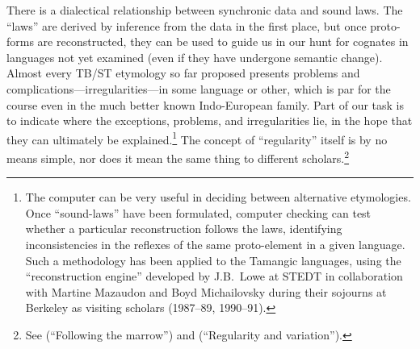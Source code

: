 There is a dialectical relationship between synchronic data and sound laws.
The “laws” are derived by inference from the data in the first place, but once
proto-forms are reconstructed, they can be used to guide us in our hunt for
cognates in languages not yet examined (even if they have undergone semantic
change). Almost every TB/ST etymology so far proposed presents problems and
complications—irregularities—in some language or other, which is par for
the course even in the much better known Indo-European family. Part of our task
is to indicate where the exceptions, problems, and irregularities lie, in the
hope that they can ultimately be explained.\footnote{The computer can be very
useful in deciding between alternative etymologies. Once “sound-laws” have been
formulated, computer checking can test whether a particular reconstruction
follows the laws, identifying inconsistencies in the reflexes of the same
proto-element in a given language. Such a methodology has been applied to the
Tamangic languages, using the “reconstruction engine” developed by J.B.\ Lowe at
STEDT in collaboration with Martine Mazaudon and Boyd Michailovsky during their
sojourns at Berkeley as visiting scholars (1987–89, 1990–91).} The concept of
“regularity” itself is by no means simple, nor does it mean the same thing to
different scholars.\footnote{See \citealt{JAM-FTM} (“Following the marrow”) and
\citeyear{JAM-RVST} (“Regularity and variation”).}


